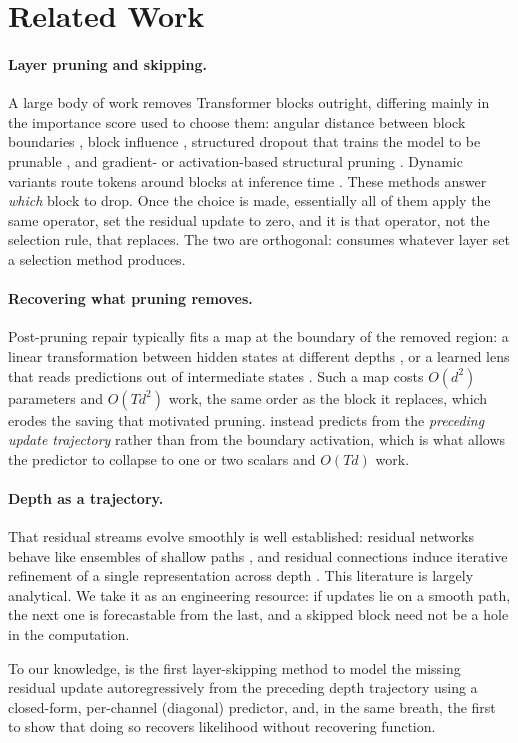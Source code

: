 \section{Related Work}
\label{sec:related-works}

\paragraph{Layer pruning and skipping.} A large body of work removes Transformer
blocks outright, differing mainly in the importance score used to choose them:
angular distance between block boundaries \citep{gromov2024unreasonable}, block
influence \citep{men2024shortgpt}, structured dropout that trains the model to be
prunable \citep{fan2020reducing}, and gradient- or activation-based structural
pruning \citep{ma2023llmpruner, frantar2023sparsegpt, sun2024simple}. Dynamic
variants route tokens around blocks at inference time
\citep{raposo2024mixture, elhoushi2024layerskip, schuster2022confident}. These
methods answer \emph{which} block to drop. Once the choice is made, essentially
all of them apply the same operator, set the residual update to zero, and it
is that operator, not the selection rule, that \mname replaces. The two are
orthogonal: \mname consumes whatever layer set a selection method produces.

\paragraph{Recovering what pruning removes.} Post-pruning repair typically fits a
map at the boundary of the removed region: a linear transformation between hidden
states at different depths \citep{din2023jump}, or a learned lens that reads
predictions out of intermediate states \citep{belrose2023eliciting}. Such a map
costs $O(d^2)$ parameters and $O(Td^2)$ work, the same order as the block it
replaces, which erodes the saving that motivated pruning. \mname instead
predicts from the \emph{preceding update trajectory} rather than from the
boundary activation, which is what allows the predictor to collapse to one or two
scalars and $O(Td)$ work.

\paragraph{Depth as a trajectory.} That residual streams evolve smoothly is well
established: residual networks behave like ensembles of shallow paths
\citep{veit2016residual}, and residual connections induce iterative refinement of
a single representation across depth \citep{jastrzebski2018residual}. This
literature is largely analytical. We take it as an engineering resource: if
updates lie on a smooth path, the next one is forecastable from the last, and a
skipped block need not be a hole in the computation.

To our knowledge, \mname is the first layer-skipping method to model the missing
residual update autoregressively from the preceding depth trajectory using a
closed-form, per-channel (diagonal) predictor, and, in the same breath, the first to
show that doing so recovers likelihood without recovering function.
